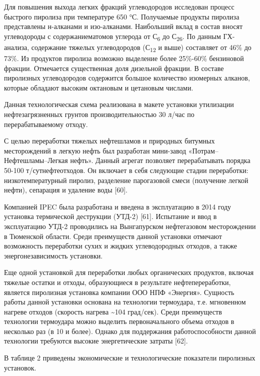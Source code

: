 Для повышения выхода легких фракций углеводородов исследован процесс
быстрого пиролиза при температуре 650 °С. Получаемые продукты пиролиза
представлены н-алканами и изо-алканами. Наибольший вклад в состав вносят
углеводороды с содержаниематомов углерода от С\textsubscript{6} до
С\textsubscript{26}. По данным ГХ-анализа, содержание тяжелых
углеводородов (С\textsubscript{12} и выше) составляет от 46\% до 73\%.
Из продуктов пиролиза возможно выделение более 25\%-60\% бензиновой
фракции. Отмечается существенная доля дизельной фракции. В составе
пиролизных углеводородов содержится большое количество изомерных
алканов, которые обладают высоким октановым и цетановым числами.

Данная технологическая схема реализована в макете установки утилизации
нефтезагрязненных грунтов производительностью 30 л/час по
перерабатываемому отходу.

С целью переработки тяжелых нефтешламов и при­родных битумных
месторождений в легкую нефть был разработан мини-завод
«Потрам--Нефтешламы--Легкая нефть». Данный агрегат позволяет
перерабатывать поряд­ка 50-100 т/сутнефтеотходов. Он включает в себя
следую­щие стадии переработки: низкотемпературный пиролиз, разделение
парогазовой смеси (получение легкой нефти), сепарация и удаление воды
{[}60{]}.

Компанией IPEC была разработана и введена в экс­плуатацию в 2014 году
установка термической деструк­ции (УТД-2) {[}61{]}. Испытание и ввод в
эксплуатацию УТД-2 проводились на Вынгапурском нефтегазовом
месторож­дении в Тюменской области. Среди преимуществ данной установки
отмечают возможность переработки сухих и жидких углеводородных отходов,
а также энергонезави­симость установки.

Еще одной установкой для переработки любых орга­нических продуктов,
включая тяжелые остатки и отходы, образующиеся в результате
нефтепереработки, является пиролизная установка компании ООО НПФ
«Энергия». Сущность работы данной установки основана на тех­нологии
термоудара, т.е. мгновенном нагреве отходов (скорость нагрева
\textasciitilde104 град/сек). Среди преимуществ технологии термоудара
можно выделить первоначально­го объема отходов в несколько раз (в 10 и
более). Однако для поддержания работоспособности данной технологии
требуются высокие энергетические затраты {[}62{]}.

В таблице 2 приведены экономические и технологические показатели
пиролизных установок.

